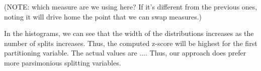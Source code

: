 (NOTE: which measure are we using here? If it's different from the previous ones, noting it will drive home the point that we can swap measures.)

In the histograms, we can see that the width of the distributions increases as the number of splits increases. Thus, the computed z-score will be highest for the first partitioning variable. The actual values are .... Thus, our approach does prefer more parsimonious splitting variables.

